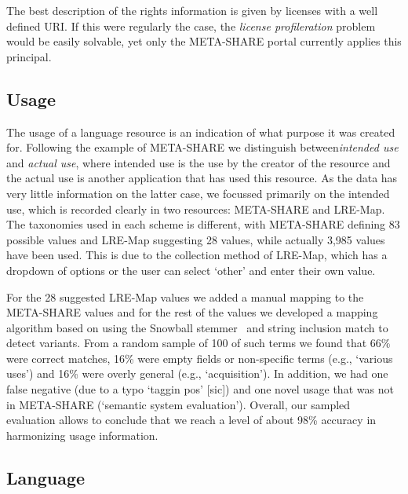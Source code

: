 \documentclass[smallextended]{svjour3}       %
\begin{document}
The best description of the rights information is given by licenses with a well
defined URI\@. If this were regularly the case, the \textit{license
profileration} problem would be easily solvable, yet only the META-SHARE portal
currently applies this principal.

\subsection{Usage}

The usage of a language resource is an indication of what purpose it was
created for. Following the example of META-SHARE we distinguish between\emph{intended use}
and \emph{actual use}, where intended use is the use by the creator of the resource and
the actual use is another application that has used this resource. As the data
has very little information on the latter case, we focussed primarily on the
intended use, which is recorded clearly in two resources: META-SHARE and
LRE-Map. The taxonomies used in each scheme is different, with META-SHARE
defining 83 possible values and LRE-Map suggesting 28 values, while actually
3,985 values have been used. This is due to the collection method of LRE-Map,
which has a dropdown of options or the user can select `other' and enter their
own value. 

For the 28 suggested LRE-Map values we added a manual mapping to the META-SHARE
values and for the rest of the values we developed a mapping algorithm based on
using the Snowball stemmer~\cite{porter2001snowball} and string inclusion match to detect
variants. From a random sample of 100 of such terms we found that 66\% were
correct matches, 16\% were empty fields or non-specific terms (e.g., `various
uses') and 16\% were overly general (e.g., `acquisition'). In addition, we had
one false negative (due to a typo `taggin pos' [sic]) and one novel usage that
was not in META-SHARE (`semantic system evaluation'). 
Overall, our sampled evaluation allows to conclude that we reach a level of
about 98\% accuracy in harmonizing usage information.

\subsection{Language}
\end{document}

